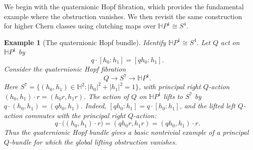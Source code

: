 \documentclass[11pt,a4paper]{article}
\numberwithin{equation}{section}
\newtheorem{example}[definition]{Example}
\theoremstyle{named}
\begin{document}
We begin with the quaternionic Hopf fibration, which provides the fundamental example where the obstruction vanishes. We then revisit the same construction for higher Chern classes using clutching maps over \(\mathbb H P^1\cong S^4\).


\begin{example}[The quaternionic Hopf bundle]
\label{ex:quaternionic-hopf-lift}
Identify \(\mathbb H P^1\cong S^4.\) Let \(Q\) act on \(\mathbb H P^1\) by
\[
q\cdot[h_0:h_1]=[qh_0:h_1].
\]
Consider the quaternionic Hopf fibration
\[
Q\longrightarrow S^7\longrightarrow \mathbb H P^1.
\]
Here \(S^7=\{(h_0,h_1)\in\mathbb H^2:|h_0|^2+|h_1|^2=1\}\), with principal right \(Q\)-action \((h_0,h_1)\cdot r=(h_0r,h_1r)\). The action of \(Q\) on \(\mathbb H P^1\) lifts to \(S^7\) by \(q\cdot(h_0,h_1)=(qh_0,h_1)\). Indeed, \([qh_0:h_1]=q\cdot[h_0:h_1]\), and the lifted left \(Q\)-action commutes with the principal right \(Q\)-action:
\[
q\cdot\bigl((h_0,h_1)\cdot r\bigr)=(qh_0r,h_1r) = (qh_0,h_1)\cdot r.
\]
Thus the quaternionic Hopf bundle gives a basic nontrivial example of a principal \(Q\)-bundle for which the global lifting obstruction vanishes.
\end{example}
\end{document}
